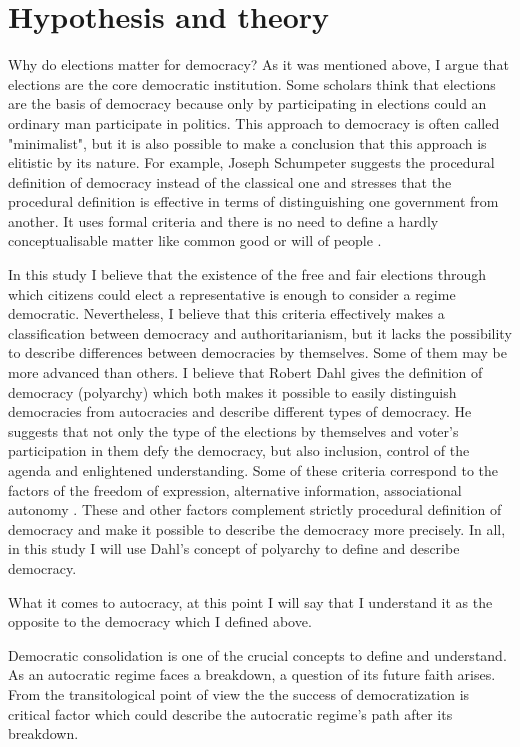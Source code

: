 \documentclass[a4paper, 12pt]{article}
\begin{document}
\section*{Hypothesis and theory}
Why do elections matter for democracy? As it was mentioned above, I argue that elections are the core democratic institution. Some scholars think that elections are the basis of democracy because only by participating in elections could an ordinary man participate in politics. This approach to democracy is often called "minimalist", but it is also possible to make a conclusion that this approach is elitistic by its nature. For example, Joseph Schumpeter suggests the procedural definition of democracy instead of the classical one and stresses that the procedural definition is effective in terms of distinguishing one government from another. It uses formal criteria and there is no need to define a hardly conceptualisable matter like common good or will of people \parencite{schumpeter_capitalism_2012}. \par
In this study I believe that the existence of the free and fair elections through which citizens could elect a representative is enough to consider a regime democratic. Nevertheless, I believe that this criteria effectively makes a classification between democracy and authoritarianism, but it lacks the possibility to describe differences between democracies by themselves. Some of them may be more advanced than others. I believe that Robert Dahl gives the definition of democracy (polyarchy) which both makes it possible to easily distinguish democracies from autocracies and describe different types of democracy. He suggests that not only the type of the elections by themselves and voter's participation in them defy the democracy, but also inclusion, control of the agenda and enlightened understanding. Some of these criteria correspond to the factors of the freedom of expression, alternative information, associational autonomy \parencite{dahl_democracy_1989}. These and other factors complement strictly procedural definition of democracy and make it possible to describe the democracy more precisely. In all, in this study I will use Dahl's concept of polyarchy to define and describe democracy. \par
What it comes to autocracy, at this point I will say that I understand it as the opposite to the democracy which I defined above. \par
Democratic consolidation is one of the crucial concepts to define and understand. As an autocratic regime faces a breakdown, a question of its future faith arises. From the transitological point of view the the success of democratization is critical factor which could describe the autocratic regime's path after its breakdown. \par
\end{document}
